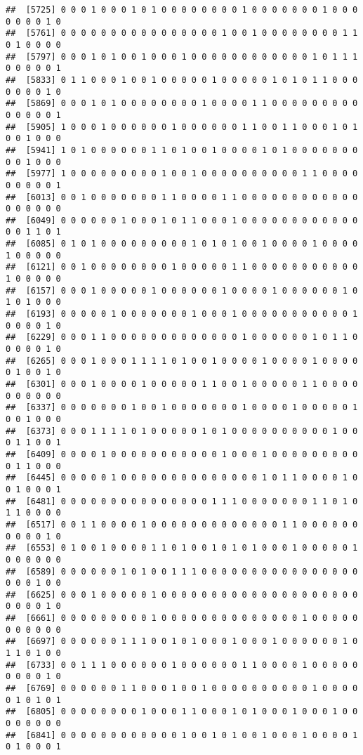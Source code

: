 \documentclass[
]{article}
\begin{document}
\begin{verbatim}
##  [5725] 0 0 0 1 0 0 0 1 0 1 0 0 0 0 0 0 0 0 1 0 0 0 0 0 0 0 1 0 0 0 0 0 0 0 1 0
##  [5761] 0 0 0 0 0 0 0 0 0 0 0 0 0 0 0 0 1 0 0 1 0 0 0 0 0 0 0 0 1 1 0 1 0 0 0 0
##  [5797] 0 0 0 1 0 1 0 0 1 0 0 0 1 0 0 0 0 0 0 0 0 0 0 0 0 1 0 1 1 1 0 0 0 0 0 1
##  [5833] 0 1 1 0 0 0 1 0 0 1 0 0 0 0 0 1 0 0 0 0 0 1 0 1 0 1 1 0 0 0 0 0 0 0 1 0
##  [5869] 0 0 0 1 0 1 0 0 0 0 0 0 0 0 1 0 0 0 0 1 1 0 0 0 0 0 0 0 0 0 0 0 0 0 0 1
##  [5905] 1 0 0 0 1 0 0 0 0 0 0 1 0 0 0 0 0 0 1 1 0 0 1 1 0 0 0 1 0 1 0 0 1 0 0 0
##  [5941] 1 0 1 0 0 0 0 0 0 1 1 0 1 0 0 1 0 0 0 0 1 0 1 0 0 0 0 0 0 0 0 0 1 0 0 0
##  [5977] 1 0 0 0 0 0 0 0 0 0 1 0 0 1 0 0 0 0 0 0 0 0 0 0 1 1 0 0 0 0 0 0 0 0 0 1
##  [6013] 0 0 1 0 0 0 0 0 0 0 1 1 0 0 0 0 1 1 0 0 0 0 0 0 0 0 0 0 0 0 0 0 0 0 0 0
##  [6049] 0 0 0 0 0 0 1 0 0 0 1 0 1 1 0 0 0 1 0 0 0 0 0 0 0 0 0 0 0 0 0 0 1 1 0 1
##  [6085] 0 1 0 1 0 0 0 0 0 0 0 0 0 1 0 1 0 1 0 0 1 0 0 0 0 1 0 0 0 0 1 0 0 0 0 0
##  [6121] 0 0 1 0 0 0 0 0 0 0 0 1 0 0 0 0 0 1 1 0 0 0 0 0 0 0 0 0 0 0 1 0 0 0 0 0
##  [6157] 0 0 0 1 0 0 0 0 0 1 0 0 0 0 0 0 1 0 0 0 0 1 0 0 0 0 0 0 1 0 1 0 1 0 0 0
##  [6193] 0 0 0 0 0 1 0 0 0 0 0 0 0 1 0 0 0 1 0 0 0 0 0 0 0 0 0 0 0 1 0 0 0 0 1 0
##  [6229] 0 0 0 1 1 0 0 0 0 0 0 0 0 0 0 0 0 0 1 0 0 0 0 0 0 1 0 1 1 0 0 0 0 0 1 0
##  [6265] 0 0 0 1 0 0 0 1 1 1 1 0 1 0 0 1 0 0 0 0 1 0 0 0 0 1 0 0 0 0 0 1 0 0 1 0
##  [6301] 0 0 0 1 0 0 0 0 1 0 0 0 0 0 1 1 0 0 1 0 0 0 0 0 1 1 0 0 0 0 0 0 0 0 0 0
##  [6337] 0 0 0 0 0 0 0 1 0 0 1 0 0 0 0 0 0 0 1 0 0 0 0 1 0 0 0 0 0 1 0 0 1 0 0 0
##  [6373] 0 0 0 1 1 1 1 0 1 0 0 0 0 0 1 0 1 0 0 0 0 0 0 0 0 0 0 1 0 0 0 1 1 0 0 1
##  [6409] 0 0 0 0 1 0 0 0 0 0 0 0 0 0 0 0 1 0 0 0 1 0 0 0 0 0 0 0 0 0 0 1 1 0 0 0
##  [6445] 0 0 0 0 0 1 0 0 0 0 0 0 0 0 0 0 0 0 0 0 1 0 1 1 0 0 0 0 1 0 0 1 0 0 0 1
##  [6481] 0 0 0 0 0 0 0 0 0 0 0 0 0 0 0 1 1 1 0 0 0 0 0 0 0 1 1 0 1 0 1 1 0 0 0 0
##  [6517] 0 0 1 1 0 0 0 0 1 0 0 0 0 0 0 0 0 0 0 0 0 0 1 1 0 0 0 0 0 0 0 0 0 0 1 0
##  [6553] 0 1 0 0 1 0 0 0 0 1 1 0 1 0 0 1 0 1 0 1 0 0 0 1 0 0 0 0 0 1 0 0 0 0 0 0
##  [6589] 0 0 0 0 0 0 1 0 1 0 0 1 1 1 0 0 0 0 0 0 0 0 0 0 0 0 0 0 0 0 0 0 0 1 0 0
##  [6625] 0 0 0 1 0 0 0 0 0 1 0 0 0 0 0 0 0 0 0 0 0 0 0 0 0 0 0 0 0 0 0 0 0 0 1 0
##  [6661] 0 0 0 0 0 0 0 0 0 1 0 0 0 0 0 0 0 0 0 0 0 0 0 0 1 0 0 0 0 0 0 0 0 0 0 0
##  [6697] 0 0 0 0 0 0 1 1 1 0 0 1 0 1 0 0 0 1 0 0 0 1 0 0 0 0 0 0 1 0 1 1 0 1 0 0
##  [6733] 0 0 1 1 1 0 0 0 0 0 0 1 0 0 0 0 0 0 1 1 0 0 0 0 1 0 0 0 0 0 0 0 0 0 1 0
##  [6769] 0 0 0 0 0 0 1 1 0 0 0 1 0 0 1 0 0 0 0 0 0 0 0 0 0 1 0 0 0 0 0 1 0 1 0 1
##  [6805] 0 0 0 0 0 0 0 0 1 0 0 0 1 1 0 0 0 1 0 1 0 0 0 1 0 0 0 1 0 0 0 0 0 0 0 0
##  [6841] 0 0 0 0 0 0 0 0 0 0 0 0 1 0 0 1 0 1 0 0 1 0 0 0 1 0 0 0 0 1 0 1 0 0 0 1

\end{verbatim}
\end{document}
